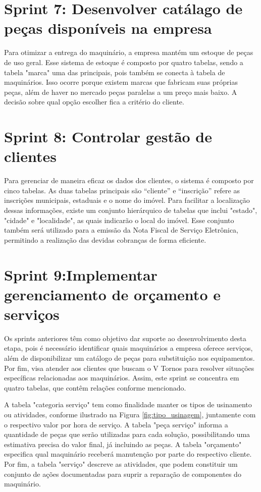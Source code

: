 \section{Sprint 7: Desenvolver catálago de peças disponíveis na empresa}
\label{sec:pecas}

Para otimizar a entrega do maquinário, a empresa mantém um estoque de peças de uso geral. Esse sistema de estoque é composto por quatro tabelas, sendo a tabela "marca" uma das principais, pois também se conecta à tabela de maquinários. Isso ocorre porque existem marcas que fabricam suas próprias peças, além de haver no mercado peças paralelas a um preço mais baixo. A decisão sobre qual opção escolher fica a critério do cliente.

\section{Sprint 8: Controlar gestão de clientes}
\label{sec:clientes}

Para gerenciar de maneira eficaz os dados dos clientes, o sistema é composto por cinco tabelas. As duas tabelas principais são ``cliente'' e ``inscrição'' refere as inscrições municipais, estaduais e o nome do imóvel. Para facilitar a localização dessas informações, existe um conjunto hierárquico de tabelas que inclui "estado", "cidade" e "localidade", as quais indicarão o local do imóvel. Esse conjunto também será utilizado para a emissão da Nota Fiscal de Serviço Eletrônica, permitindo a realização das devidas cobranças de forma eficiente.

\section{Sprint 9:Implementar gerenciamento de orçamento e serviços}
\label{sec:orcamentos_servicos}

Os sprints anteriores têm como objetivo dar suporte ao desenvolvimento desta etapa, pois é necessário identificar quais maquinários a empresa oferece serviços, além de disponibilizar um catálogo de peças para substituição nos equipamentos. Por fim, visa atender aos clientes que buscam o V Tornos para resolver situações específicas relacionadas aos maquinários. Assim, este sprint se concentra em quatro tabelas, que contêm relações conforme mencionado.

A tabela "categoria serviço" tem como finalidade manter os tipos de usinamento ou atividades, conforme ilustrado na Figura \ref{fig:tipo_usinagem}, juntamente com o respectivo valor por hora de serviço. A tabela "peça serviço" informa a quantidade de peças que serão utilizadas para cada solução, possibilitando uma estimativa precisa do valor final, já incluindo as peças. A tabela "orçamento" especifica qual maquinário receberá manutenção por parte do respectivo cliente. Por fim, a tabela "serviço" descreve as atividades, que podem constituir um conjunto de ações documentadas para suprir a reparação de componentes do maquinário.

